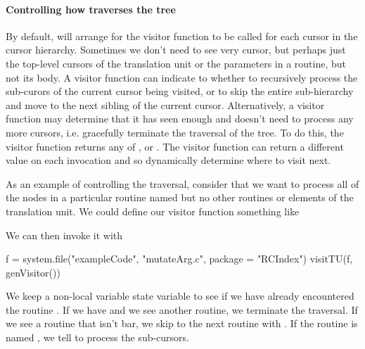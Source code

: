 \paragraph{Controlling how \libclang{} traverses the tree}
By default,  will arrange for the visitor function
to be called for each cursor in the cursor hierarchy.  Sometimes we
don't need to see very cursor, but perhaps just the top-level cursors
of the translation unit or the parameters in a routine, but not its
body.  A visitor function can indicate to \libclang{} whether to
recursively process the sub-curors of the current cursor being
visited, or to skip the entire sub-hierarchy and move to the next
sibling of the current cursor.  Alternatively, a visitor function may
determine that it has seen enough and doesn't need to process any more
cursors, i.e. gracefully terminate the traversal of the tree.  To do
this, the visitor function returns any of ,
 or .  The
visitor function can return a different value on each invocation and
so dynamically determine where to visit next.  

As an example of controlling the traversal, consider that we want to
process all of the nodes in a particular routine named  but
no other routines or elements of the translation unit. 
We could define our visitor function something like
We can then invoke it with
\begin{RCode}
f = system.file("exampleCode", "mutateArg.c", package = "RCIndex")
visitTU(f, genVisitor())  
\end{RCode}
We keep a non-local variable state variable to see if we have
already encountered the routine .
If we have and we see another routine, we terminate the traversal.
If we see a routine that isn't bar, we skip to the next routine
with .
If the routine is named , we tell \libclang{}
to process the sub-cursors.


